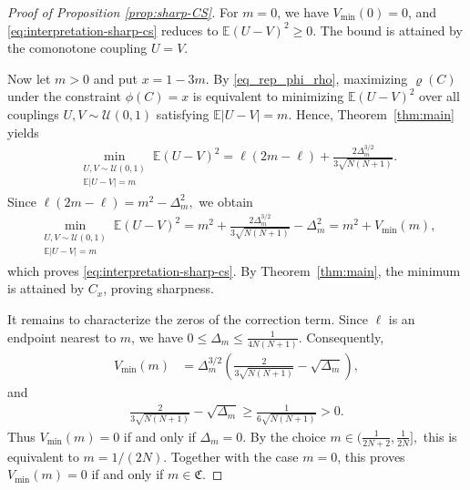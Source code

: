 \documentclass{article}
\newcommand{\E}{\mathbb{E}}
\newcommand{\cU}{\mathcal{U}}
\begin{document}
\begin{proof}[Proof of Proposition \ref{prop:sharp-CS}]
For \(m=0\), we have \(V_{\operatorname{min}}(0)=0\), and \eqref{eq:interpretation-sharp-cs} reduces to \(\E(U-V)^2\geq0\).
The bound is attained by the comonotone coupling \(U=V\).

Now let \(m>0\) and put \(x=1-3m\).
By \eqref{eq_rep_phi_rho}, maximizing \(\varrho(C)\) under the constraint \(\phi(C)=x\) is equivalent to minimizing \(\E(U-V)^2\) over all couplings \(U,V\sim\cU(0,1)\) satisfying \(\E|U-V|=m\).
Hence, Theorem~\ref{thm:main} yields
\begin{align*}
    \min_{\substack{U,V\sim\cU(0,1)\\ \E|U-V|=m}}
    \E(U-V)^2
    =
    \ell(2m-\ell)
    +
    \frac{2\Delta_m^{3/2}}{3\sqrt{N(N+1)}}.
\end{align*}
Since
\(
    \ell(2m-\ell)=m^2-\Delta_m^2,
\)
we obtain
\begin{align*}
    \min_{\substack{U,V\sim\cU(0,1)\\ \E|U-V|=m}}
    \E(U-V)^2
    =
    m^2+
    \frac{2\Delta_m^{3/2}}{3\sqrt{N(N+1)}}-\Delta_m^2
    =
    m^2+V_{\operatorname{min}}(m),
\end{align*}
which proves \eqref{eq:interpretation-sharp-cs}.
By Theorem~\ref{thm:main}, the minimum is attained by \(C_x\), proving sharpness.

It remains to characterize the zeros of the correction term.
Since \(\ell\) is an endpoint nearest to \(m\), we have \(0\leq\Delta_m\leq\frac1{4N(N+1)}\).
Consequently,
\begin{align*}
    V_{\operatorname{min}}(m)
    &=
    \Delta_m^{3/2}
    \left(
        \frac2{3\sqrt{N(N+1)}}-\sqrt{\Delta_m}
    \right),
\end{align*}
and
\begin{align*}
    \frac2{3\sqrt{N(N+1)}}-\sqrt{\Delta_m}
    \geq
    \frac1{6\sqrt{N(N+1)}}
    >0.
\end{align*}
Thus \(V_{\operatorname{min}}(m)=0\) if and only if \(\Delta_m=0\).
By the choice
\(
    m\in(\frac1{2N+2},\frac1{2N}],
\)
this is equivalent to \(m=1/(2N)\).
Together with the case \(m=0\), this proves \(V_{\operatorname{min}}(m)=0\) if and only if \(m\in\mathfrak C\).
\end{proof}
\end{document}
